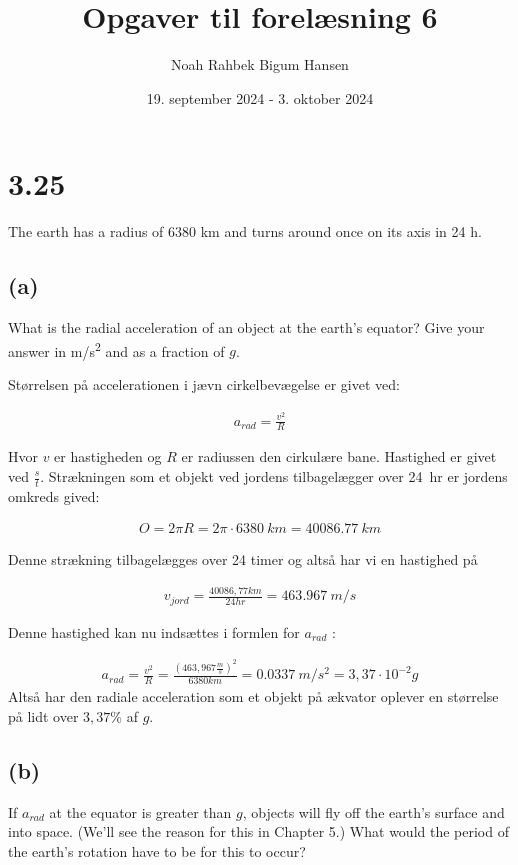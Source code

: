 \documentclass[12pt]{article}
\title{Opgaver til forelæsning 6}
\author{Noah Rahbek Bigum Hansen}
\date{19. september 2024 - 3. oktober 2024}
\begin{document}
\section*{3.25}
	The earth has a radius of 6380 km and turns around once on its axis in 24 h.
	
	\subsection*{(a)}
		What is the radial acceleration of an object at the earth’s equator? Give your answer in \si{m/s^2} and as a fraction of $g$. 

		\bigbreak

Størrelsen på accelerationen i jævn cirkelbevægelse er givet ved:

\begin{gather*}
	a_{rad} = \frac{v^2}{R}
\end{gather*}

Hvor  $v$ er hastigheden og  $R$ er radiussen den cirkulære bane. Hastighed er givet ved $\frac{s}{t}$. Strækningen som et objekt ved jordens tilbagelægger over \qty{24}{hr} er jordens omkreds gived:

\begin{gather*}
	O = 2\pi R = 2\pi \cdot \qty{6380}{km} = \qty{40086,77}{km}
\end{gather*}

Denne strækning tilbagelægges over 24 timer og altså har vi en hastighed på

\begin{gather*}
	v_{jord} = \frac{40086,77 km}{24 hr} = \qty{463,967}{m/s}
\end{gather*}

Denne hastighed kan nu indsættes i formlen for $a_{rad}$ :

\begin{gather*}
	a_{rad} = \frac{v^2}{R} = \frac{(463,967 \frac{m}{s})^2}{6380 km} = \qty{0,0337}{m/s^2} = 3,37 \cdot 10^{-2} g
\end{gather*}
Altså har den radiale acceleration som et objekt på ækvator oplever en størrelse på lidt over $ 3,37\% $ af $g$.  


	\subsection*{(b)}
	If $a_{rad}$ at the equator is greater than $g$, objects will fly off the earth’s surface and into space. (We’ll see the reason for this in Chapter 5.) What would the period of the earth’s rotation have to be for this to occur?
\end{document}
